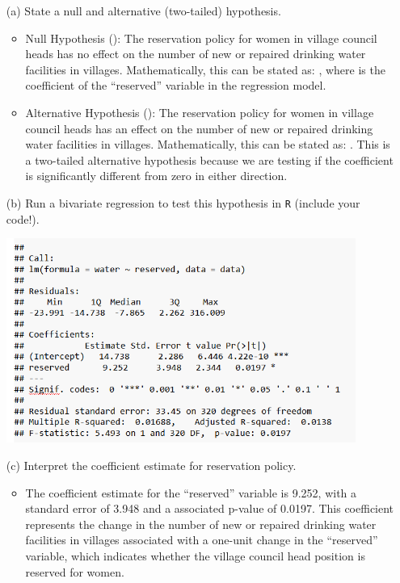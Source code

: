 \documentclass[12pt,letterpaper]{article}
\begin{document}
\newpage
\begin{enumerate}
	\item [(a)] State a null and alternative (two-tailed) hypothesis. 
	 
	\begin{itemize}
		\item Null Hypothesis (): The reservation policy for women in village council heads has no effect on the number of new or repaired drinking water facilities in villages. Mathematically, this can be stated as: , where  is the coefficient of the “reserved” variable in the regression model.
		\item Alternative Hypothesis (): The reservation policy for women in village council heads has an effect on the number of new or repaired drinking water facilities in villages. Mathematically, this can be stated as: . This is a two-tailed alternative hypothesis because we are testing if the coefficient is significantly different from zero in either direction.
	\end{itemize}
	\vspace{2cm}
	\item [(b)] Run a bivariate regression to test this hypothesis in \texttt{R} (include your code!).
	 
   	\includegraphics[width=0.9\textwidth]{01.png}
	\vspace{6cm}
	\item [(c)] Interpret the coefficient estimate for reservation policy. 
	\begin{itemize}
		\item The coefficient estimate for the “reserved” variable is 9.252, with a standard error of 3.948 and a associated p-value of 0.0197. This coefficient represents the change in the number of new or repaired drinking water facilities in villages associated with a one-unit change in the “reserved” variable, which indicates whether the village council head position is reserved for women.

\end{itemize}
\end{enumerate}
\end{document}

